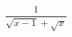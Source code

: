 \hspace*{2mm}\begin{minipage}[t]{\dimexpr\linewidth-2mm\relax}\vspace{0pt}
$\dfrac{1}{\sqrt{x-1}+\sqrt{x}}$\end{minipage}
